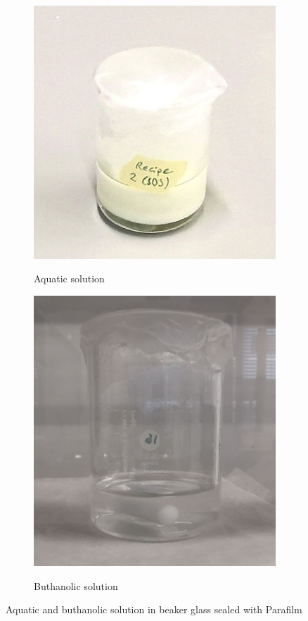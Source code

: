 \documentclass[a4paper]{article}
\begin{document}
\begin{figure}[htb]
	\centering
	\begin{subfigure}{0.49\textwidth}
		\centering
		\includegraphics[height=0.8\textwidth]{Pics/sol-aq.png}
		\label{fig:sol-aq}
		\caption{Aquatic solution}
	\end{subfigure}
	\begin{subfigure}{0.49\textwidth}
		\centering
		\includegraphics[height=0.8\textwidth]{Pics/sol-bu.png}
		\label{fig:sol-bu}
		\caption{Buthanolic solution}
	\end{subfigure}
	\label{fig:sol}
	\caption{Aquatic and buthanolic solution in beaker glass sealed with Parafilm}
\end{figure}
\end{document}
